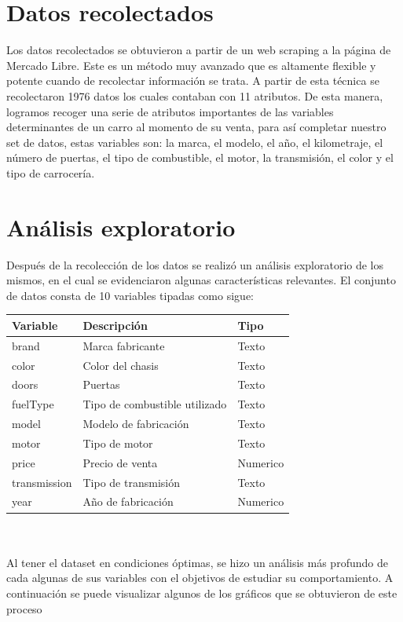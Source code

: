 \documentclass[journal]{..//IEEEtran/IEEEtran}
\begin{document}
\section{Datos recolectados}
Los datos recolectados se obtuvieron a partir de un web scraping a la página de Mercado Libre. Este es un método muy avanzado que es altamente flexible y potente cuando de recolectar información se trata. A partir de esta técnica se recolectaron 1976 datos los cuales contaban con 11 atributos. De esta manera, logramos recoger una serie de atributos importantes de las variables determinantes de un carro al momento de su venta, para así completar nuestro set de datos, estas variables son: la marca, el modelo, el año, el kilometraje, el número de puertas, el tipo de combustible, el motor, la transmisión, el color y el tipo de carrocería.

\section{Análisis exploratorio}

Después de la recolección de los datos se realizó un análisis exploratorio de los mismos, en el cual se evidenciaron algunas características relevantes. El conjunto de datos consta de 10 variables tipadas como sigue:


\begin{tabular}{l l l}
    Variable & Descripción & Tipo \\ \hline
    brand & Marca fabricante & Texto \\
    color & Color del chasis &Texto \\
    doors & Puertas & Texto \\
    fuelType & Tipo de combustible utilizado & Texto \\
    model & Modelo de fabricación & Texto \\
    motor & Tipo de motor & Texto \\
    price & Precio de venta & Numerico \\
    transmission & Tipo de transmisión & Texto \\
    year & Año de fabricación & Numerico 
\end{tabular}\\\\



Al tener el dataset en condiciones óptimas, se hizo un análisis más profundo de cada algunas de sus variables con el objetivos de estudiar su comportamiento. A continuación se puede visualizar algunos de los gráficos que se obtuvieron de este proceso
\end{document}

